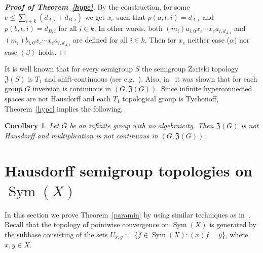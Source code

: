 \documentclass[11pt]{amsart}
\newtheorem{corollary}[theorem]{Corollary}
\theoremstyle{definition}
\newcommand{\Sym}{\operatorname{Sym}}
\begin{document}
\begin{proof}[{\bf Proof of Theorem~\ref{hype}}]
By the construction, for some $e\leq \sum_{i\in k}(d_{A,i}+d_{B,i})$ we get $x_{e}$ such that $p(a,t,i)=d_{A,i}$ and $p(b,t,i)=d_{B,i}$ for all $i\in k$. In other words, both $(m_i)a_{i,0}x_{e}\cdots x_{e}a_{i,d_{A,i}}$ and $(m_i)b_{i,0}x_{e}\cdots x_{e}a_{i,d_{A,i}}$ are defined for all $i\in k$. Then for $x_e$ neither case ($\alpha$) nor case $(\beta)$ holds.
\end{proof}


It is well known that for every semigroup $S$ the semigroup Zariski topology $\mathfrak{Z}(S)$ is $T_1$ and shift-continuous (see e.g.~\cite{main}). Also, in~\cite{main} it was shown that for each group $G$ inversion is continuous in  $(G,\mathfrak{Z}(G))$. Since infinite hyperconnected spaces are not Hausdorff and each $T_1$ topological group is Tychonoff, Theorem~\ref{hype} implies the following.


\begin{corollary}
Let $G$ be an infinite group with no algebraicity. Then $\mathfrak{Z}(G)$ is not Hausdorff and multiplication is not continuous in $(G,\mathfrak{Z}(G))$. 
\end{corollary}



 









\section{Hausdorff semigroup topologies on $\Sym(X)$}

In this section we prove Theorem~\ref{paramin} by using similar techniques as in~\cite{Gaughan}.
Recall that the topology of pointwise convergence on $\Sym(X)$ is generated by the subbase consisting of the sets $U_{x,y}:=\{f\in\Sym(X): (x)f=y\}$, where $x,y\in X$.
\end{document}
